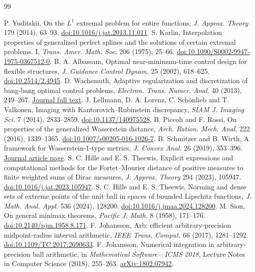 \documentclass[11pt,a4paper]{article}
\numberwithin{equation}{section}
\theoremstyle{remark}\newtheorem{remark}[theorem]{Remark}
\begin{document}
\begin{thebibliography}{99}\small\raggedright
{} P. Yuditskii, On the $L^1$ extremal problem for entire
functions, \emph{J. Approx. Theory} 179 (2014), 63--93.
\href{https://doi.org/10.1016/j.jat.2013.11.011}{doi:10.1016/j.jat.2013.11.011}.
 S. Karlin, Interpolation properties of generalized perfect
splines and the solutions of certain extremal problems. I,
\emph{Trans. Amer. Math. Soc.} 206 (1975), 25--66.
\href{https://doi.org/10.1090/S0002-9947-1975-0367512-0}{doi:10.1090/S0002-9947-1975-0367512-0}.
 B. A. Albassam, Optimal near-minimum-time control design
for flexible structures, \emph{J. Guidance Control Dynam.} 25 (2002), 618--625.
\href{https://doi.org/10.2514/2.4945}{doi:10.2514/2.4945}.
 D. Wachsmuth, Adaptive regularization and discretization
of bang-bang optimal control problems, \emph{Electron. Trans. Numer. Anal.}
40 (2013), 249--267.
\href{https://etna.ricam.oeaw.ac.at/vol.40.2013/pp249-267.dir/pp249-267.pdf}{Journal full text}.
 J. Lellmann, D. A. Lorenz, C. Sch\"onlieb and T. Valkonen,
Imaging with Kantorovich--Rubinstein discrepancy,
\emph{SIAM J. Imaging Sci.} 7 (2014), 2833--2859.
\href{https://doi.org/10.1137/140975528}{doi:10.1137/140975528}.
 B. Piccoli and F. Rossi, On properties of the generalized
Wasserstein distance, \emph{Arch. Ration. Mech. Anal.} 222 (2016), 1339--1365.
\href{https://doi.org/10.1007/s00205-016-1026-7}{doi:10.1007/s00205-016-1026-7}.
 B. Schmitzer and B. Wirth, A framework for Wasserstein-1-type
metrics, \emph{J. Convex Anal.} 26 (2019), 353--396.
\href{https://journalofconvexanalysis.com/articles/jca26020/}{Journal article page}.
 S. C. Hille and E. S. Theewis, Explicit expressions
and computational methods for the Fortet--Mourier distance of positive
measures to finite weighted sums of Dirac measures,
\emph{J. Approx. Theory} 294 (2023), 105947.
\href{https://doi.org/10.1016/j.jat.2023.105947}{doi:10.1016/j.jat.2023.105947}.
 S. C. Hille and E. S. Theewis, Norming and dense sets
of extreme points of the unit ball in spaces of bounded Lipschitz functions,
\emph{J. Math. Anal. Appl.} 536 (2024), 128200.
\href{https://doi.org/10.1016/j.jmaa.2024.128200}{doi:10.1016/j.jmaa.2024.128200}.
 M. Sion, On general minimax theorems,
\emph{Pacific J. Math.} 8 (1958), 171--176.
\href{https://doi.org/10.2140/pjm.1958.8.171}{doi:10.2140/pjm.1958.8.171}.
 F. Johansson, Arb: efficient arbitrary-precision
midpoint-radius interval arithmetic, \emph{IEEE Trans. Comput.}
66 (2017), 1281--1292.
\href{https://doi.org/10.1109/TC.2017.2690633}{doi:10.1109/TC.2017.2690633}.
 F. Johansson, Numerical integration in
arbitrary-precision ball arithmetic, in \emph{Mathematical Software---ICMS
2018}, Lecture Notes in Computer Science (2018), 255--263.
\href{https://arxiv.org/abs/1802.07942}{arXiv:1802.07942}.
\end{thebibliography}
\end{document}
